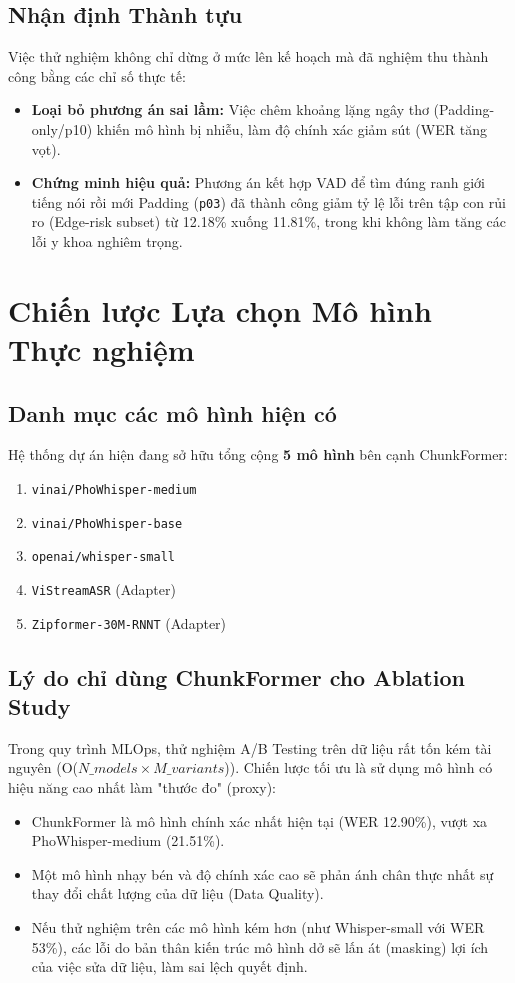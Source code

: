 \documentclass[12pt,a4paper]{article}
\begin{document}
\subsection{Nhận định Thành tựu}
Việc thử nghiệm không chỉ dừng ở mức lên kế hoạch mà đã nghiệm thu thành công bằng các chỉ số thực tế:
\begin{itemize}[leftmargin=1.2cm]
    \item \textbf{Loại bỏ phương án sai lầm:} Việc chêm khoảng lặng ngây thơ (Padding-only/p10) khiến mô hình bị nhiễu, làm độ chính xác giảm sút (WER tăng vọt).
    \item \textbf{Chứng minh hiệu quả:} Phương án kết hợp VAD để tìm đúng ranh giới tiếng nói rồi mới Padding (\texttt{p03}) đã thành công giảm tỷ lệ lỗi trên tập con rủi ro (Edge-risk subset) từ 12.18\% xuống 11.81\%, trong khi không làm tăng các lỗi y khoa nghiêm trọng.
\end{itemize}

\section{Chiến lược Lựa chọn Mô hình Thực nghiệm}

\subsection{Danh mục các mô hình hiện có}
Hệ thống dự án hiện đang sở hữu tổng cộng \textbf{5 mô hình} bên cạnh ChunkFormer:
\begin{enumerate}[leftmargin=1.2cm]
    \item \texttt{vinai/PhoWhisper-medium}
    \item \texttt{vinai/PhoWhisper-base}
    \item \texttt{openai/whisper-small}
    \item \texttt{ViStreamASR} (Adapter)
    \item \texttt{Zipformer-30M-RNNT} (Adapter)
\end{enumerate}

\subsection{Lý do chỉ dùng ChunkFormer cho Ablation Study}
Trong quy trình MLOps, thử nghiệm A/B Testing trên dữ liệu rất tốn kém tài nguyên (O($N\_models \times M\_variants$)). Chiến lược tối ưu là sử dụng mô hình có hiệu năng cao nhất làm "thước đo" (proxy):
\begin{itemize}[leftmargin=1.2cm]
    \item ChunkFormer là mô hình chính xác nhất hiện tại (WER 12.90\%), vượt xa PhoWhisper-medium (21.51\%).
    \item Một mô hình nhạy bén và độ chính xác cao sẽ phản ánh chân thực nhất sự thay đổi chất lượng của dữ liệu (Data Quality).
    \item Nếu thử nghiệm trên các mô hình kém hơn (như Whisper-small với WER 53\%), các lỗi do bản thân kiến trúc mô hình dở sẽ lấn át (masking) lợi ích của việc sửa dữ liệu, làm sai lệch quyết định.
\end{itemize}
\end{document}
